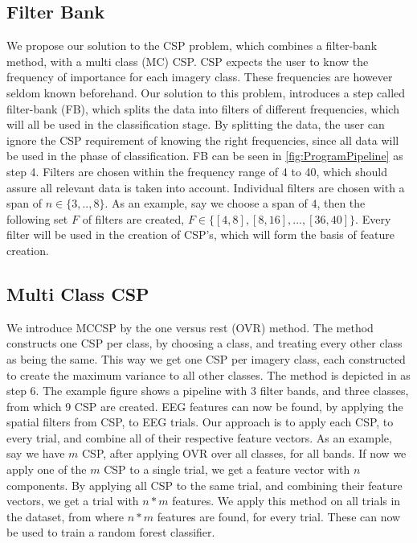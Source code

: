 \subsection{Filter Bank}
We propose our solution to the CSP problem, which combines a filter-bank method, with a multi class (MC) CSP. CSP expects the user to know the frequency of importance for each imagery class. These frequencies are however seldom known beforehand. Our solution to this problem, introduces a step called filter-bank (FB), which splits the data into filters of different frequencies, which will all be used in the classification stage. By splitting the data, the user can ignore the CSP requirement of knowing the right frequencies, since all data will be used in the phase of classification. FB can be seen in \cref{fig:ProgramPipeline} as step 4. Filters are chosen within the frequency range of 4 to 40, which should assure all relevant data is taken into account. Individual filters are chosen with a span of $n \in \{3,..,8\}$. As an example, say we choose a span of $4$, then the following set $F$ of filters are created, $F \in \{[4, 8], [8, 16],...,[36, 40]\}$. Every filter will be used in the creation of CSP's, which will form the basis of feature creation.   

\subsection{Multi Class CSP}
We introduce MCCSP by the one versus rest (OVR) method. The method constructs one CSP per class, by choosing a class, and treating every other class as being the same. This way we get one CSP per imagery class, each constructed to create the maximum variance to all other classes. The method is depicted in  as step 6. The example figure shows a pipeline with 3 filter bands, and three classes, from which 9 CSP are created. EEG features can now be found, by applying the spatial filters from CSP, to EEG trials. Our approach is to apply each CSP, to every trial, and combine all of their respective feature vectors. As an example, say we have $m$ CSP, after applying OVR over all classes, for all bands. If now we apply one of the $m$ CSP to a single trial, we get a feature vector with $n$ components. By applying all CSP to the same trial, and combining their feature vectors, we get a trial with $n * m$ features. We apply this method on all trials in the dataset, from where $n * m$ features are found, for every trial. These can now be used to train a random forest classifier.     







